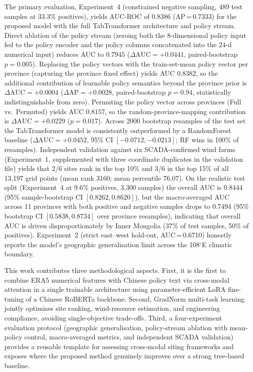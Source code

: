 \documentclass[12pt, a4paper]{article}
\begin{document}
The primary evaluation, Experiment~4 (constrained negative
sampling, 489 test samples at 33.3\% positives), yields
AUC-ROC of 0.8386 (AP\,=\,0.7333) for the proposed model
with the full TabTransformer architecture and policy
stream. Direct ablation of the policy stream (zeroing both
the $8$-dimensional policy input fed to the policy encoder
and the policy columns concatenated into the $24$-d
numerical input) reduces AUC to $0.7945$
($\Delta\text{AUC}=+0.0441$, paired-bootstrap $p=0.005$).
Replacing the policy vectors with the train-set-mean policy
vector per province (capturing the province fixed effect)
yields AUC $0.8382$, so the additional contribution of
learnable policy semantics beyond the province prior is
$\Delta\text{AUC}=+0.0004$ ($\Delta\text{AP}=+0.0028$,
paired-bootstrap $p=0.94$, statistically
indistinguishable from zero). Permuting the policy vector
across provinces (Full vs.\ Permuted) yields AUC $0.8157$,
so the random-province-mapping contribution is
$\Delta\text{AUC}=+0.0229$ ($p=0.017$). Across 2000
bootstrap resamples of the test set the TabTransformer model
is consistently outperformed by a RandomForest baseline
($\Delta\text{AUC}=+0.0452$, 95\% CI $[-0.0712, -0.0213]$;
RF wins in 100\% of resamples).
Independent validation against six SCADA-confirmed wind
farms (Experiment~1, supplemented with three coordinate
duplicates in the validation file) yields that 2/6 sites
rank in the top 10\% and 3/6 in the top 15\% of all
13,197 grid points (mean rank 3160; mean percentile
76.07). On the realistic test split (Experiment~4 at
9.6\% positives, 3,300 samples) the overall AUC is
0.8444 (95\% sample-bootstrap CI $[0.8262, 0.8620]$),
but the macro-averaged AUC across 11 provinces with both
positive and negative samples drops to 0.7494 (95\%
bootstrap CI $[0.5838, 0.8734]$ over province resamples),
indicating that overall AUC is driven disproportionately
by Inner Mongolia (37\% of test samples, 50\% of positives).
Experiment~2 (strict east--west hold-out, AUC\,=\,0.6710)
honestly reports the model's geographic generalisation
limit across the 108$^\circ$E climatic boundary.

This work contributes three methodological aspects.
First, it is the first to combine ERA5 numerical features
with Chinese policy text via cross-modal attention in a
single trainable architecture using parameter-efficient
LoRA fine-tuning of a Chinese RoBERTa backbone. Second,
GradNorm multi-task learning jointly optimises site
ranking, wind-resource estimation, and engineering
compliance, avoiding single-objective trade-offs. Third,
a four-experiment evaluation protocol (geographic
generalisation, policy-stream ablation with mean-policy
control, macro-averaged metrics, and independent SCADA
validation) provides a reusable template for assessing
cross-modal siting frameworks and exposes where the
proposed method genuinely improves over a strong
tree-based baseline.
\end{document}
